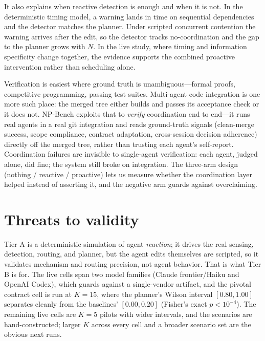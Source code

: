 It also explains when reactive detection is enough and when it is not. In the deterministic timing
model, a warning lands in time on sequential dependencies and the detector matches the planner. Under
scripted concurrent contention the warning arrives after the edit, so the detector tracks
no-coordination and the gap to the planner grows with $N$. In the live study, where timing and
information specificity change together, the evidence supports the combined proactive intervention
rather than scheduling alone.

Verification is easiest where ground truth is unambiguous---formal proofs, competitive programming,
passing test suites. Multi-agent code integration is one more such place: the merged tree either
builds and passes its acceptance check or it does not. NP-Bench exploits that to \emph{verify}
coordination end to end---it runs real agents in a real git integration and reads ground-truth
signals (clean-merge success, scope compliance, contract adaptation, cross-session decision
adherence) directly off the merged tree, rather than trusting each agent's self-report. Coordination
failures are invisible to single-agent verification: each agent, judged alone, did fine; the system
still broke on integration. The three-arm design (nothing / reactive / proactive) lets us measure
whether the coordination layer helped instead of asserting it, and the negative arm guards against
overclaiming.

\section{Threats to validity}
\label{sec:threats}

Tier A is a deterministic simulation of agent \emph{reaction};
it drives the real sensing, detection, routing, and planner, but the agent edits
themselves are scripted, so it validates mechanism and routing precision, not agent behavior. That
is what Tier B is for. The live cells span two model families (Claude frontier/Haiku and OpenAI
Codex), which guards against a single-vendor artifact, and the pivotal contract cell is run at
$K{=}15$, where the planner's Wilson interval $[0.80,1.00]$ separates cleanly from the baselines'
$[0.00,0.20]$ (Fisher's exact $p<10^{-4}$). The remaining live cells are $K{=}5$ pilots with wider
intervals, and the scenarios are hand-constructed; larger $K$ across every cell and a broader
scenario set are the obvious next runs.

